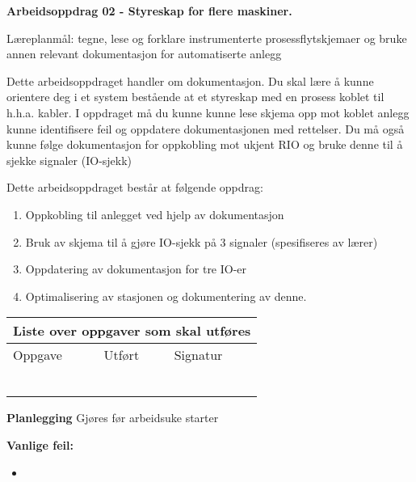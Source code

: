 
\noindent
{\bf Arbeidsoppdrag 02 - Styreskap for flere maskiner.}

\vskip 5pt
Læreplanmål:
tegne, lese og forklare instrumenterte prosessflytskjemaer og bruke annen relevant dokumentasjon for automatiserte anlegg

Dette arbeidsoppdraget handler om dokumentasjon. Du skal lære å kunne orientere deg i et system bestående at et styreskap med en prosess koblet til h.h.a. kabler. I oppdraget må du kunne kunne lese skjema opp mot koblet anlegg kunne identifisere feil og oppdatere dokumentasjonen med rettelser. Du må også kunne følge dokumentasjon for oppkobling mot ukjent RIO og bruke denne til å sjekke signaler (IO-sjekk)

Dette arbeidsoppdraget består at følgende oppdrag:
\begin{enumerate}
	\item Oppkobling til anlegget ved hjelp av dokumentasjon
	\item Bruk av skjema til å gjøre IO-sjekk på 3 signaler (spesifiseres av lærer)
	\item Oppdatering av dokumentasjon for tre IO-er
	\item Optimalisering av stasjonen og dokumentering av denne. 
\end{enumerate}



\begin{center}
\begin{tabular}{ | m{8cm} | m{1cm}| m{2cm} | } 
\hline
\multicolumn{3}{|c|}{Liste over oppgaver som skal utføres} \\
	\hline
	Oppgave	& Utført & Signatur \\ 
	\hline
	\hline
	& & \\ 
	\hline
	& & \\ 
	\hline
	& & \\ 
	\hline
	& & \\ 
	\hline
	& & \\ 
	\hline
	& & \\ 
	\hline
\end{tabular}
\end{center}

\textbf{Planlegging}
Gjøres før arbeidsuke starter

\textbf{Vanlige feil:}
\begin{itemize}[noitemsep]
	\item 
\end{itemize}

